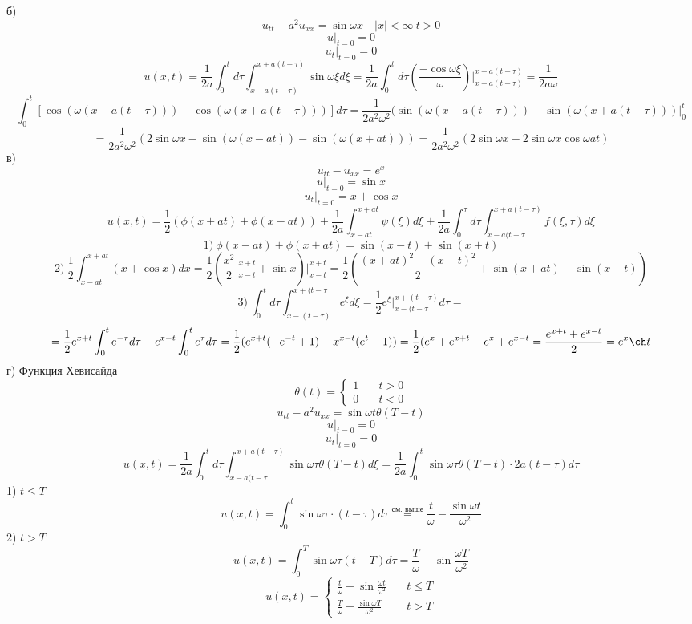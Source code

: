 \documentclass[a4paper]{article}
\begin{document}
б)
\[
    u_{t t} - a^2 u_{xx} = \sin\omega x \quad |x| < \infty \ t > 0
\]
\[
    u |_{t=0} = 0
\]
\[
    u_t |_{t=0} = 0
\]
\[
    u(x,t) = \frac{1}{2a} \int_{0}^{t} d\tau \int_{x-a(t-\tau)}^{x+a(t-\tau)} 
    \sin\omega \xi d\xi = \frac{1}{2a} \int_{0}^{t} d\tau \left( \frac{-\cos\omega\xi}
    {\omega}\right) \big|_{x-a(t-\tau)}^{x+a(t-\tau)} = \frac{1}{2a\omega} 
\]
\[
    \int_{0}^{t} [\cos(\omega(x-a(t-\tau))) - \cos(\omega(x + a(t-\tau)))] d\tau
    = \frac{1}{2a^2\omega^2} (\sin(\omega(x-a(t-\tau))) - \sin(\omega(x + a(t-\tau)))
    |_{0}^{t}
\]
\[
    = \frac{1}{2a^2\omega^2}( 2 \sin\omega x - \sin(\omega(x-at)) - \sin(\omega(x+at)))
    = \frac{1}{2a^2\omega^2} (2\sin\omega x - 2\sin\omega x \cos\omega at)
\]
в)
\[
    u_{t t} - u_{xx} = e^{x}
\]
\[
    u |_{t=0} = \sin x
\]
\[
    u_t |_{t=0} = x + \cos x
\]
\[
    u(x,t) = \frac{1}{2}(\phi(x+at) + \phi(x-at)) + \frac{1}{2a} 
    \int_{x-at}^{x+at} \psi(\xi)d\xi + \frac{1}{2a} \int_{0}^{\tau} d\tau  
    \int_{x-a(t-\tau}^{x+a(t-\tau)} f(\xi, \tau)d\xi 
\]
\[
    1) \ \phi(x-at) + \phi(x+at) = \sin(x-t) + \sin(x+t)
\]
\[
    2) \ \frac{1}{2} \int_{x-at}^{x+at} (x + \cos x)dx = \frac{1}{2} \left(
        \frac{x^2}{2} \big|_{x-t}^{x+t} + \sin x\right) \big|_{x-t}^{x+t} = 
        \frac{1}{2} \left( \frac{(x+at)^2 - (x-t)^2}{2} + \sin(x+at) - \sin(x-t)
            \right)
\]
\[
    3) \ \int_{0}^{t} d\tau \int_{x-(t-\tau)}^{x+(t-\tau} e^{\xi}d\xi =
    \frac{1}{2} e^{\xi} \big|_{x-(t-\tau}^{x+(t-\tau)} d\tau = 
\]
\[
    = \frac{1}{2} e^{x+t}\int_{0}^{t} e^{-\tau}d\tau - e^{x-t}
    \int_{0}^{t} e^{\tau}d\tau = \frac{1}{2} ( e^{x+t}(-e^{-t} + 1) - x^{x-t}
    (e^{t} - 1)) = \frac{1}{2} (e^{x}+ e^{x+t} - e^{x} + e^{x-t} = 
    \frac{e^{x+t}+ e^{x-t}}{2} = e^{x}\ch t
\]
г) Функция Хевисайда
\[
    \theta(t) = 
    \begin{cases}
        1 &\quad t > 0\\
        0 &\quad t < 0
    \end{cases}
\]
\[
    u_{t t} - a^2 u_{xx} = \sin\omega t \theta(T - t)
\]
\[
    u |_{t=0} = 0
\]
\[
    u_t |_{t=0} = 0
\]
\[
    u(x,t) = \frac{1}{2a} \int_{0}^{t} d\tau \int_{x-a(t-\tau}^{x+a(t-\tau)} 
    \sin\omega\tau \theta(T - t)d\xi = \frac{1}{2a} \int_{0}^{t} \sin\omega\tau
    \theta(T - t) \cdot 2a(t - \tau)d\tau
\]
1) $ t \leq T $ 
\[
u(x,t) = \int_{0}^{t} \sin\omega \tau \cdot (t - \tau) d\tau 
\stackrel{\text{см. выше}}{=} \frac{t}{\omega} - \frac{\sin\omega t}{\omega^2} 
\]
2) $ t > T $ 
\[
    u(x,t) = \int_{0}^{T} \sin\omega\tau ( t - T) d\tau = \frac{T}{\omega} -
    \sin \frac{\omega T}{\omega^2} 
\]
\[
    u(x,t) = \begin{cases}
        \frac{t}{\omega}  - \sin \frac{\omega t}{\omega^2} &\quad t \leq T\\
        \frac{T}{\omega}  - \frac{\sin\omega T}{\omega^2} &\quad t > T
    \end{cases}
\]
\end{document}
